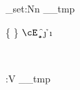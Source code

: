 \documentclass[12pt]{article}
\begin{document}
\ExplSyntaxOn
\precattl_set:Nn \__tmp {
	\cB \a \cE \z
	\cB \{ \cE \}
	\cB \( \cE \)
	\cM \b
	\cT \c
	\cP \d
	\cU \e
	\cD \f
	\cS \j
	\cL \g
	\cO \h
	\cA \i \cA {\~\ }
	
	\cM \  %
	\cT \  %
	\cP \  %
	\cU \  %
	\cD \  %
	\cS \  %
	\cL \  %
	\cO \  %
}
\pretty:V \__tmp
\ExplSyntaxOff
\end{document}
